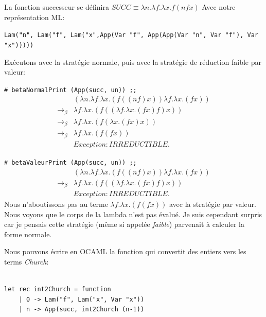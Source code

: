 La fonction successeur se définira $SUCC \equiv \lambda n.\lambda f.\lambda x.f (n f x)$
Avec notre représentation ML: 

\verb+Lam("n", Lam("f", Lam("x",App(Var "f", App(App(Var "n", Var "f"), Var "x")))))+

Exécutons avec la stratégie normale, puis avec la stratégie de réduction faible par valeur:



\verb+# betaNormalPrint (App(succ, un)) ;;+
$$
\begin{array}{ll}
& (\lambda n . \lambda f . \lambda x . (f((nf)x))\lambda f . \lambda x . (fx))   \\
\rightarrow _\beta & \lambda f . \lambda x . (f((\lambda f . \lambda x . (fx)f)x))   \\
\rightarrow _\beta & \lambda f . \lambda x . (f(\lambda x . (fx)x))   \\
\rightarrow _\beta & \lambda f . \lambda x . (f(fx))   \\
& Exception: IRREDUCTIBLE.
\end{array}
$$

\verb+# betaValeurPrint (App(succ, un)) ;;+
$$
\begin{array}{ll}
& (\lambda n . \lambda f . \lambda x . (f((nf)x))\lambda f . \lambda x . (fx))   \\
\rightarrow _\beta & \lambda f . \lambda x . (f((\lambda f . \lambda x . (fx)f)x))   \\
& Exception: IRREDUCTIBLE.
\end{array} 
$$
Nous n'aboutissons pas au terme $\lambda f . \lambda x . (f(fx)) $ avec la stratégie par valeur. Nous voyons que le corps de la lambda
n'est pas évalué. Je suis cependant surpris car je pensais cette stratégie (même si appelée \textit{faible}) parvenait à calculer la
forme normale.

Nous pouvons écrire en OCAML la fonction qui convertit des entiers vers les terms \textit{Church}:
\begin{Verbatim}

let rec int2Church = function
	| 0 -> Lam("f", Lam("x", Var "x"))
	| n -> App(succ, int2Church (n-1))
\end{Verbatim}

